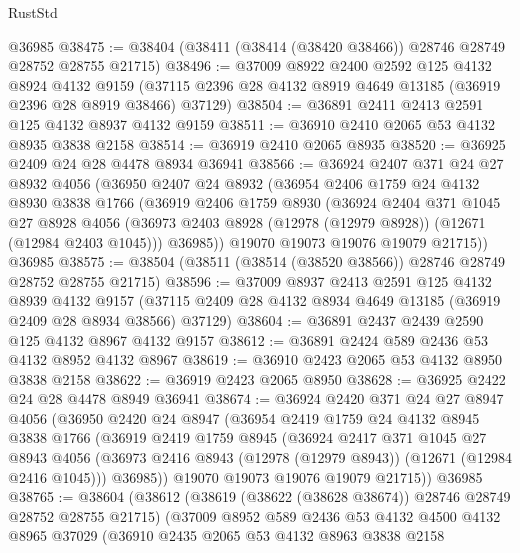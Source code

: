 \begin{lexlean}{RustStd}
\begin{coremodule}
    @36985
@38475 := @38404 (@38411 (@38414 (@38420 @38466)) @28746 @28749 @28752 @28755 @21715)
@38496 := @37009
    @8922
    @2400
    @2592
    @125
    @4132
    @8924
    @4132
    @9159
    (@37115 @2396 @28 @4132 @8919 @4649 @13185 (@36919 @2396 @28 @8919 @38466) @37129)
@38504 := @36891 @2411 @2413 @2591 @125 @4132 @8937 @4132 @9159
@38511 := @36910 @2410 @2065 @53 @4132 @8935 @3838 @2158
@38514 := @36919 @2410 @2065 @8935
@38520 := @36925 @2409 @24 @28 @4478 @8934 @36941
@38566 := @36924
    @2407
    @371
    @24
    @27
    @8932
    @4056
    (@36950
      @2407
      @24
      @8932
      (@36954
        @2406
        @1759
        @24
        @4132
        @8930
        @3838
        @1766
        (@36919
          @2406
          @1759
          @8930
          (@36924
            @2404
            @371
            @1045
            @27
            @8928
            @4056
            (@36973 @2403 @8928 (@12978 (@12979 @8928)) (@12671 (@12984 @2403 @1045)))
            @36985))
        @19070
        @19073
        @19076
        @19079
        @21715))
    @36985
@38575 := @38504 (@38511 (@38514 (@38520 @38566)) @28746 @28749 @28752 @28755 @21715)
@38596 := @37009
    @8937
    @2413
    @2591
    @125
    @4132
    @8939
    @4132
    @9157
    (@37115 @2409 @28 @4132 @8934 @4649 @13185 (@36919 @2409 @28 @8934 @38566) @37129)
@38604 := @36891 @2437 @2439 @2590 @125 @4132 @8967 @4132 @9157
@38612 := @36891 @2424 @589 @2436 @53 @4132 @8952 @4132 @8967
@38619 := @36910 @2423 @2065 @53 @4132 @8950 @3838 @2158
@38622 := @36919 @2423 @2065 @8950
@38628 := @36925 @2422 @24 @28 @4478 @8949 @36941
@38674 := @36924
    @2420
    @371
    @24
    @27
    @8947
    @4056
    (@36950
      @2420
      @24
      @8947
      (@36954
        @2419
        @1759
        @24
        @4132
        @8945
        @3838
        @1766
        (@36919
          @2419
          @1759
          @8945
          (@36924
            @2417
            @371
            @1045
            @27
            @8943
            @4056
            (@36973 @2416 @8943 (@12978 (@12979 @8943)) (@12671 (@12984 @2416 @1045)))
            @36985))
        @19070
        @19073
        @19076
        @19079
        @21715))
    @36985
@38765 := @38604
    (@38612
      (@38619 (@38622 (@38628 @38674)) @28746 @28749 @28752 @28755 @21715)
      (@37009
        @8952
        @589
        @2436
        @53
        @4132
        @4500
        @4132
        @8965
        @37029
        (@36910
          @2435
          @2065
          @53
          @4132
          @8963
          @3838
          @2158

\end{coremodule}
\end{lexlean}
